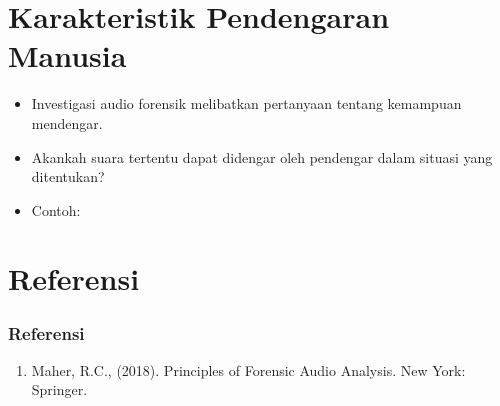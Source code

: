 \documentclass[pdflatex,compress]{beamer}
\begin{document}
\section{Karakteristik Pendengaran Manusia}

\begin{itemize}
	\item Investigasi audio forensik melibatkan pertanyaan tentang kemampuan mendengar.
	\item Akankah suara tertentu dapat didengar oleh pendengar dalam situasi yang ditentukan?
	\item Contoh: 
\end{itemize}

\section{Referensi}

\begin{frame}
	\frametitle{Referensi}
	\begin{enumerate}
		\item Maher, R.C., (2018). Principles of Forensic Audio Analysis. New York: Springer.
	\end{enumerate}
\end{frame}
\end{document}
